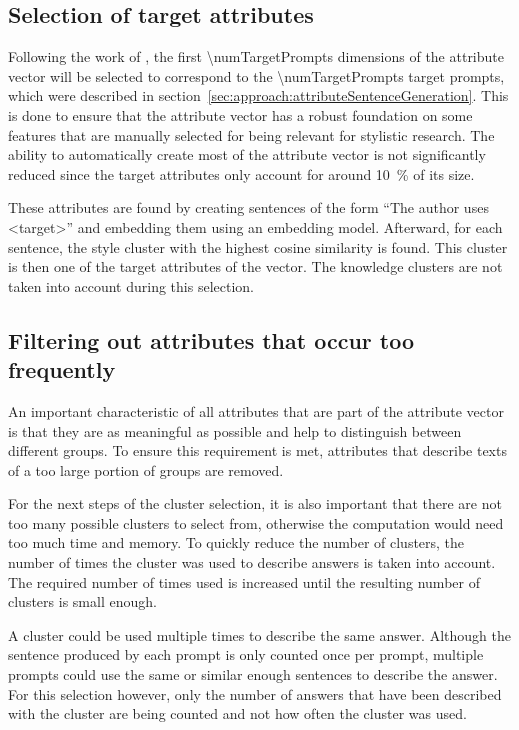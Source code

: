 \subsection{Selection of target attributes}
\label{sec:approach:selection:targetAttributes}
Following the work of \citet{patelLearningInterpretableStyle2023}, the first \num{\numTargetPrompts} dimensions of the attribute vector will be selected to correspond to the \num{\numTargetPrompts} target prompts, which were described in section~\ref{sec:approach:attributeSentenceGeneration}.
This is done to ensure that the attribute vector has a robust foundation on some features that are manually selected for being relevant for stylistic research. The ability to automatically create most of the attribute vector is not significantly reduced since the target attributes only account for around \SI{10}{\percent} of its size. %

These attributes are found by creating sentences of the form \enquote{The author uses <target>} and embedding them using an embedding model.
Afterward, for each sentence, the style cluster with the highest cosine similarity is found. This cluster is then one of the target attributes of the vector. The knowledge clusters are not taken into account during this selection.


\subsection{Filtering out attributes that occur too frequently}
\label{sec:approach:selection:filteringOccurance}
An important characteristic of all attributes that are part of the attribute vector is that they are as meaningful as possible and help to distinguish between different groups. To ensure this requirement is met, attributes that describe texts of a too large portion of groups are removed.

For the next steps of the cluster selection, it is also important that there are not too many possible clusters to select from, otherwise the computation would need too much time and memory. To quickly reduce the number of clusters, the number of times the cluster was used to describe answers is taken into account. The required number of times used is increased until the resulting number of clusters is small enough.

A cluster could be used multiple times to describe the same answer. Although the sentence produced by each prompt is only counted once per prompt, multiple prompts could use the same or similar enough sentences to describe the answer. For this selection however, only the number of answers that have been described with the cluster are being counted and not how often the cluster was used.

